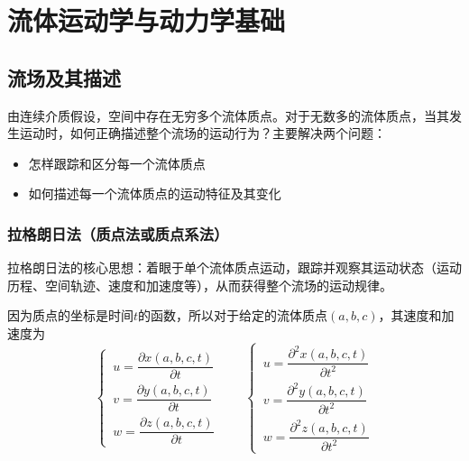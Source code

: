 \chapter{流体运动学与动力学基础}
\thispagestyle{empty}

\section{流场及其描述}
由连续介质假设，空间中存在无穷多个流体质点。对于无数多的流体质点，当其发生运动时，如何正确描述整个流场的运动行为？主要解决两个问题：\vspace*{-0.5em}
\begin{itemize}
	\item 怎样跟踪和区分每一个流体质点\vspace*{-0.5em}
	\item 如何描述每一个流体质点的运动特征及其变化
\end{itemize}

\subsection{拉格朗日法（质点法或质点系法）}

拉格朗日法的核心思想：着眼于单个流体质点运动，跟踪并观察其运动状态（运动历程、空间轨迹、速度和加速度等），从而获得整个流场的运动规律。


因为质点的坐标是时间$t$的函数，所以对于给定的流体质点$(a,b,c)$，其速度和加速度为
\begin{equation}
	\begin{cases}
		\, u = \dfrac{\partial x(a,b,c,t)}{\partial t} \\[0.7em]
		\, v = \dfrac{\partial y(a,b,c,t)}{\partial t} \\[0.7em]
		\, w = \dfrac{\partial z(a,b,c,t)}{\partial t}
	\end{cases}
	\qquad 
	\begin{cases}
		\, u = \dfrac{\partial^2 x(a,b,c,t)}{\partial t^2} \\[0.7em]
		\, v = \dfrac{\partial^2 y(a,b,c,t)}{\partial t^2} \\[0.7em]
		\, w = \dfrac{\partial^2 z(a,b,c,t)}{\partial t^2}
	\end{cases}
\end{equation}

